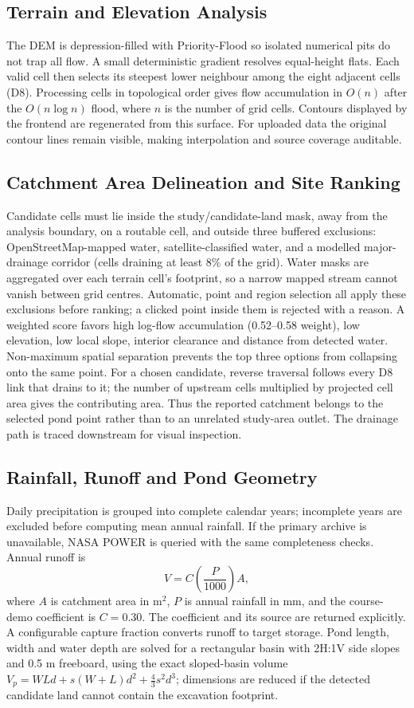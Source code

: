 \documentclass[manuscript,screen,review]{acmart}
\begin{document}
\subsection{Terrain and Elevation Analysis}
The DEM is depression-filled with Priority-Flood so isolated numerical pits do not trap all flow. A small deterministic gradient resolves equal-height flats. Each valid cell then selects its steepest lower neighbour among the eight adjacent cells (D8). Processing cells in topological order gives flow accumulation in $O(n)$ after the $O(n\log n)$ flood, where $n$ is the number of grid cells. Contours displayed by the frontend are regenerated from this surface. For uploaded data the original contour lines remain visible, making interpolation and source coverage auditable.

\subsection{Catchment Area Delineation and Site Ranking}
Candidate cells must lie inside the study/candidate-land mask, away from the analysis boundary, on a routable cell, and outside three buffered exclusions: OpenStreetMap-mapped water, satellite-classified water, and a modelled major-drainage corridor (cells draining at least 8\% of the grid). Water masks are aggregated over each terrain cell's footprint, so a narrow mapped stream cannot vanish between grid centres. Automatic, point and region selection all apply these exclusions before ranking; a clicked point inside them is rejected with a reason. A weighted score favors high log-flow accumulation (0.52--0.58 weight), low elevation, low local slope, interior clearance and distance from detected water. Non-maximum spatial separation prevents the top three options from collapsing onto the same point. For a chosen candidate, reverse traversal follows every D8 link that drains to it; the number of upstream cells multiplied by projected cell area gives the contributing area. Thus the reported catchment belongs to the selected pond point rather than to an unrelated study-area outlet. The drainage path is traced downstream for visual inspection.

\subsection{Rainfall, Runoff and Pond Geometry}
Daily precipitation is grouped into complete calendar years; incomplete years are excluded before computing mean annual rainfall. If the primary archive is unavailable, NASA POWER is queried with the same completeness checks. Annual runoff is
\begin{equation}
  V=C\left(\frac{P}{1000}\right)A,
\end{equation}
where $A$ is catchment area in m$^2$, $P$ is annual rainfall in mm, and the course-demo coefficient is $C=0.30$. The coefficient and its source are returned explicitly. A configurable capture fraction converts runoff to target storage. Pond length, width and water depth are solved for a rectangular basin with 2H:1V side slopes and 0.5 m freeboard, using the exact sloped-basin volume $V_p=WLd+s(W+L)d^2+\tfrac{4}{3}s^2d^3$; dimensions are reduced if the detected candidate land cannot contain the excavation footprint.
\end{document}
